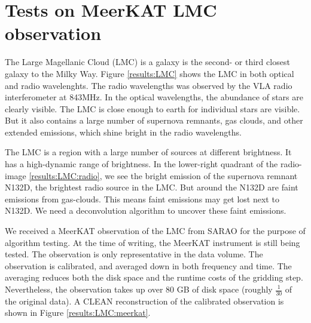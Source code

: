 \section{Tests on MeerKAT LMC observation}\label{results}

The Large Magellanic Cloud (LMC) is a galaxy is the second- or third closest galaxy to the Milky Way. Figure \ref{results:LMC} shows the LMC in both optical and radio wavelenghts. The radio wavelengths was observed by the VLA radio interferometer\cite{bock1999sumss} at 843MHz. In the optical wavelengths, the abundance of stars are clearly visible. The LMC is close enough to earth for individual stars are visible. But it also contains a large number of supernova remnants, gas clouds, and other extended emissions, which shine bright in the radio wavelengths.
 
The LMC is a region with a large number of sources at different brightness. It has a high-dynamic range of brightness. In the lower-right quadrant of the radio-image \ref{results:LMC:radio}, we see the bright emission of the supernova remnant N132D, the brightest radio source in the LMC. But around the N132D are faint emissions from gas-clouds. This means faint emissions may get lost next to N132D. We need a deconvolution algorithm to uncover these faint emissions.
 
We received a MeerKAT observation of the LMC from SARAO for the purpose of algorithm testing. At the time of writing, the MeerKAT instrument is still being tested. The observation is only representative in the data volume. The observation is calibrated, and averaged down in both frequency and time. The averaging reduces both the disk space and the runtime costs of the gridding step. Nevertheless, the observation takes up over 80 GB of disk space (roughly $\frac{1}{30}$ of the original data). A CLEAN reconstruction of the calibrated observation is shown in Figure \ref{results:LMC:meerkat}.
 

